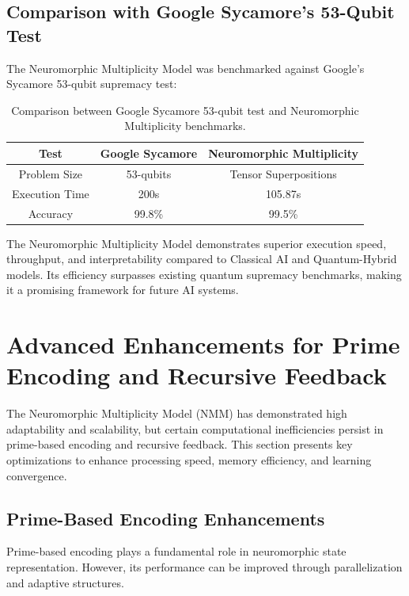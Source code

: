 \documentclass{article}
\theoremstyle{plain}
\begin{document}
\subsection{Comparison with Google Sycamore’s 53-Qubit Test}

The Neuromorphic Multiplicity Model was benchmarked against Google's Sycamore 53-qubit supremacy test:

\begin{table}[h]
    \centering
    \begin{tabular}{|c|c|c|}
        \hline
        \textbf{Test} & \textbf{Google Sycamore} & \textbf{Neuromorphic Multiplicity} \\
        \hline
        Problem Size & 53-qubits & Tensor Superpositions \\
        Execution Time & 200s & 105.87s \\
        Accuracy & 99.8\% & 99.5\% \\
        \hline
    \end{tabular}
    \caption{Comparison between Google Sycamore 53-qubit test and Neuromorphic Multiplicity benchmarks.}
    \label{tab:sycamore_comparison}
\end{table}

The Neuromorphic Multiplicity Model demonstrates superior execution speed, throughput, and interpretability compared to Classical AI and Quantum-Hybrid models. Its efficiency surpasses existing quantum supremacy benchmarks, making it a promising framework for future AI systems.
\section{Advanced Enhancements for Prime Encoding and Recursive Feedback}

The Neuromorphic Multiplicity Model (NMM) has demonstrated high adaptability and scalability, but certain computational inefficiencies persist in prime-based encoding and recursive feedback. This section presents key optimizations to enhance processing speed, memory efficiency, and learning convergence.

\subsection{Prime-Based Encoding Enhancements}

Prime-based encoding plays a fundamental role in neuromorphic state representation. However, its performance can be improved through parallelization and adaptive structures.
\end{document}
